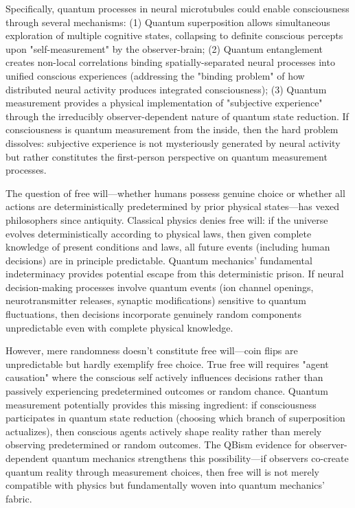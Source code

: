 \documentclass[11pt,a4paper,twoside]{article}
\begin{document}
Specifically, quantum processes in neural microtubules could enable consciousness through several mechanisms: (1) Quantum superposition allows simultaneous exploration of multiple cognitive states, collapsing to definite conscious percepts upon "self-measurement" by the observer-brain; (2) Quantum entanglement creates non-local correlations binding spatially-separated neural processes into unified conscious experiences (addressing the "binding problem" of how distributed neural activity produces integrated consciousness); (3) Quantum measurement provides a physical implementation of "subjective experience" through the irreducibly observer-dependent nature of quantum state reduction. If consciousness is quantum measurement from the inside, then the hard problem dissolves: subjective experience is not mysteriously generated by neural activity but rather constitutes the first-person perspective on quantum measurement processes.

The question of free will---whether humans possess genuine choice or whether all actions are deterministically predetermined by prior physical states---has vexed philosophers since antiquity. Classical physics denies free will: if the universe evolves deterministically according to physical laws, then given complete knowledge of present conditions and laws, all future events (including human decisions) are in principle predictable. Quantum mechanics' fundamental indeterminacy provides potential escape from this deterministic prison. If neural decision-making processes involve quantum events (ion channel openings, neurotransmitter releases, synaptic modifications) sensitive to quantum fluctuations, then decisions incorporate genuinely random components unpredictable even with complete physical knowledge.

However, mere randomness doesn't constitute free will---coin flips are unpredictable but hardly exemplify free choice. True free will requires "agent causation" where the conscious self actively influences decisions rather than passively experiencing predetermined outcomes or random chance. Quantum measurement potentially provides this missing ingredient: if consciousness participates in quantum state reduction (choosing which branch of superposition actualizes), then conscious agents actively shape reality rather than merely observing predetermined or random outcomes. The QBism evidence for observer-dependent quantum mechanics strengthens this possibility---if observers co-create quantum reality through measurement choices, then free will is not merely compatible with physics but fundamentally woven into quantum mechanics' fabric.
\end{document}
